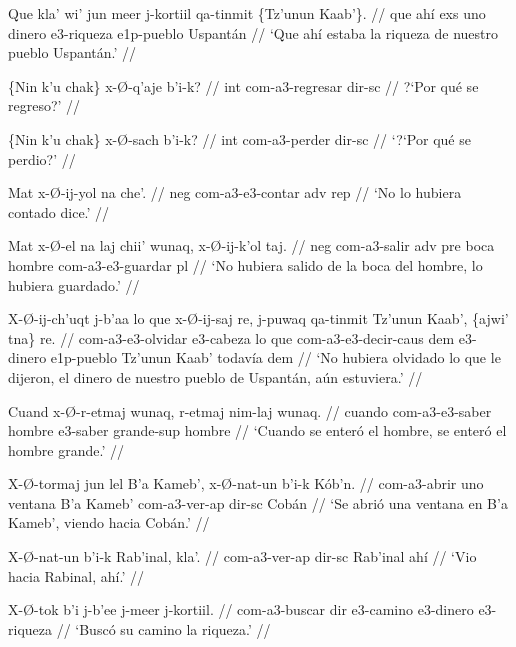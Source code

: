 \documentclass[12pt]{article}
\begin{document}
\ex
\begingl
  \gla  Que kla' wi' jun meer j-kortiil qa-tinmit \{Tz'unun Kaab'\}. //
  \glb  que ah\'i exs uno dinero e3-riqueza e1p-pueblo Uspant\'an //
  \glft `Que ah\'i estaba la riqueza de nuestro pueblo Uspant\'an.' //
\endgl
\xe

\ex
\begingl
  \gla  \{Nin k'u chak\} x-\O-q'aje b'i-k? //
  \glb  int com-a3-regresar dir-sc  //
  \glft ?`Por qu\'e se regreso?' //
\endgl
\xe

\ex
\begingl
  \gla  \{Nin k'u chak\} x-\O-sach b'i-k? //
  \glb int com-a3-perder dir-sc //
  \glft `?`Por qu\'e se perdio?' //
\endgl
\xe

\ex
\begingl
  \gla  Mat x-\O-ij-yol na che'. //
  \glb neg com-a3-e3-contar adv rep //
  \glft `No lo hubiera contado dice.' //
\endgl
\xe


\ex
\begingl
  \gla  Mat x-\O-el na laj chii' wunaq, x-\O-ij-k'ol taj. //
  \glb neg com-a3-salir adv pre boca hombre com-a3-e3-guardar pl //
  \glft `No hubiera salido de la boca del hombre, lo hubiera guardado.' //
\endgl
\xe

\ex
\begingl
  \gla X-\O-ij-ch'uqt j-b'aa lo que x-\O-ij-saj re, j-puwaq qa-tinmit Tz'unun Kaab', \{ajwi' tna\} re. //
  \glb com-a3-e3-olvidar e3-cabeza lo que com-a3-e3-decir-caus dem e3-dinero e1p-pueblo Tz'unun Kaab' todav\'ia dem //
  \glft `No hubiera olvidado lo que le dijeron, el dinero de nuestro pueblo de Uspant\'an, a\'un estuviera.' //
\endgl
\xe

\ex
\begingl
  \gla  Cuand x-\O-r-etmaj wunaq, r-etmaj nim-laj wunaq. //
  \glb cuando com-a3-e3-saber hombre e3-saber grande-sup hombre //
  \glft `Cuando se enter\'o el hombre, se enter\'o el hombre grande.' //
\endgl
\xe

\ex
\xe

\ex
\begingl
  \gla  X-\O-tormaj jun lel B'a Kameb', x-\O-nat-un b'i-k K\'ob'n. //
  \glb com-a3-abrir uno ventana B'a Kameb' com-a3-ver-ap dir-sc Cob\'an //
  \glft `Se abri\'o una ventana en B'a Kameb', viendo hacia Cob\'an.' //
\endgl
\xe


\ex
\begingl
  \gla X-\O-nat-un b'i-k Rab'inal, kla'. //
  \glb com-a3-ver-ap dir-sc Rab'inal ah\'i //
  \glft `Vio hacia Rabinal, ah\'i.' //
\endgl
\xe

\ex
\begingl
  \gla  X-\O-tok b'i j-b'ee j-meer j-kortiil. //
  \glb com-a3-buscar dir e3-camino e3-dinero e3-riqueza //
  \glft `Busc\'o su camino la riqueza.' //
\endgl
\xe
\end{document}
